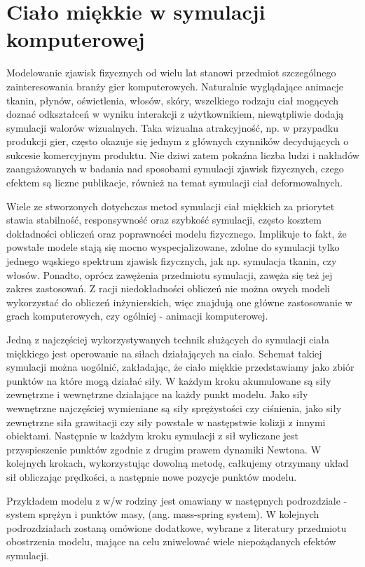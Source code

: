 \chapter{Ciało miękkie w symulacji komputerowej} 

Modelowanie zjawisk fizycznych od wielu lat stanowi przedmiot szczególnego
zainteresowania branży gier komputerowych. Naturalnie wyglądające animacje tkanin, płynów, oświetlenia, włosów, skóry, wszelkiego rodzaju ciał mogących doznać odkształceń w wyniku interakcji z użytkownikiem, niewątpliwie dodają symulacji walorów wizualnych. Taka wizualna atrakcyjność, np. w przypadku produkcji gier, często okazuje się jednym z głównych czynników decydujących o sukcesie komercyjnym produktu. Nie dziwi zatem pokaźna liczba ludzi i nakładów zaangażowanych w badania nad sposobami symulacji zjawisk fizycznych, czego efektem są liczne publikacje, również na temat symulacji ciał deformowalnych.

Wiele ze stworzonych dotychczas metod symulacji ciał miękkich za priorytet stawia  stabilność, responsywność oraz szybkość symulacji, często kosztem dokładności obliczeń oraz poprawności modelu fizycznego. Implikuje to fakt, że powstałe modele stają się mocno wyspecjalizowane, zdolne do symulacji tylko jednego wąskiego spektrum zjawisk fizycznych, jak np. symulacja tkanin, czy włosów. Ponadto, oprócz zawężenia przedmiotu symulacji, zawęża się też jej zakres zastosowań. Z racji niedokładności obliczeń nie można owych modeli wykorzystać do obliczeń inżynierskich, więc znajdują one główne zastosowanie w grach komputerowych, czy ogólniej - animacji komputerowej. \cite{pbdyn}

Jedną z najczęściej wykorzystywanych technik służących do symulacji ciała miękkiego jest operowanie na siłach działających na ciało. Schemat takiej symulacji można uogólnić, zakładając, że ciało miękkie przedstawiamy jako zbiór punktów na które mogą działać siły. W każdym kroku akumulowane są siły zewnętrzne i wewnętrzne działające na każdy punkt modelu. Jako siły wewnętrzne najczęściej wymieniane są siły sprężystości czy ciśnienia, jako siły zewnętrzne siła grawitacji czy siły powstałe w następstwie kolizji z innymi obiektami. Następnie w każdym kroku symulacji z sił wyliczane jest przyspieszenie punktów zgodnie z drugim prawem dynamiki Newtona. W kolejnych krokach, wykorzystując dowolną metodę, całkujemy otrzymany układ sił obliczając prędkości, a następnie nowe pozycje punktów modelu.\cite{pbdyn}

Przykładem modelu z w/w rodziny jest omawiany w następnych podrozdziale - system sprężyn i punktów masy, (ang. mass-spring system). W kolejnych podrozdziałach zostaną omówione dodatkowe, wybrane z literatury przedmiotu obostrzenia modelu, mające na celu zniwelować wiele niepożądanych efektów symulacji.

